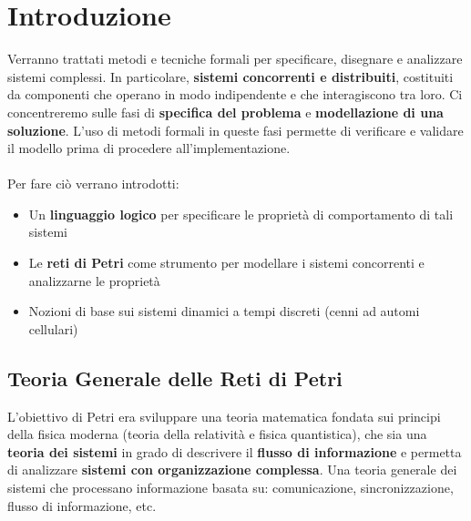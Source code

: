 \section{Introduzione}

Verranno trattati metodi e tecniche formali per specificare, disegnare e analizzare sistemi complessi. In particolare, \textbf{sistemi concorrenti e distribuiti}, costituiti da componenti che operano in modo indipendente e che interagiscono tra loro. Ci concentreremo sulle fasi di \textbf{specifica del problema} e \textbf{modellazione di una soluzione}. L'uso di metodi formali in queste fasi permette di verificare e validare il modello prima di procedere all'implementazione.
\\
\\
Per fare ciò verrano introdotti:
\begin{itemize}
	\item Un \textbf{linguaggio logico} per specificare le proprietà di comportamento di tali sistemi
	\item Le \textbf{reti di Petri} come strumento per modellare i sistemi concorrenti e analizzarne le proprietà
	\item Nozioni di base sui sistemi dinamici a tempi discreti (cenni ad automi cellulari)
\end{itemize}

\subsection{Teoria Generale delle Reti di Petri}

L'obiettivo di Petri era sviluppare una teoria matematica fondata sui principi della fisica moderna (teoria della relatività e fisica quantistica), che sia una \textbf{teoria dei sistemi} in grado di descrivere il \textbf{flusso di informazione} e permetta di analizzare \textbf{sistemi con organizzazione complessa}. Una teoria generale dei sistemi che processano informazione basata su: comunicazione, sincronizzazione, flusso di informazione, etc.
